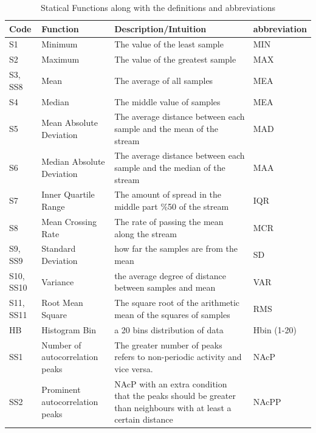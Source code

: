\documentclass[journal,article,submit,moreauthors,pdftex]{Definitions/mdpi}
\begin{document}
\begin{table}[H]
	\caption{Statical Functions along with the definitions and abbreviations }
	\centering
	\begin{tabular}{p{0.9cm}p{5cm}p{7cm}p{1.3cm}}
		\toprule
		\textbf{Code} & \textbf{Function} & \textbf{Description/Intuition} & \textbf{{\scriptsize abbreviation}} \\
		\midrule
		{\footnotesize S1}&Minimum & {\scriptsize The value of the least sample}& MIN\\
		S2&Maximum & {\scriptsize The value of the greatest sample}& MAX\\
		{\footnotesize S3, SS8}&Mean&  {\scriptsize The average of all samples}& MEA\\
		{\footnotesize S4}&Median&  {\scriptsize The middle value of samples}& MEA\\
		{\footnotesize S5}&{\footnotesize Mean Absolute Deviation}& {\scriptsize The average distance between each sample and the mean of the stream}& MAD\\
		{\footnotesize S6}&{\footnotesize Median Absolute Deviation}& {\scriptsize The average distance between each sample and the median of the stream}& MAA\\
		{\footnotesize S7}&Inner Quartile Range  & {\scriptsize The amount of spread in the middle part \%50 of the stream}& IQR\\
		{\footnotesize S8}&Mean Crossing Rate& {\scriptsize The rate of passing the mean along the stream}& MCR\\
		{\footnotesize S9, SS9}&Standard Deviation& {\scriptsize how far the samples are from the mean}& SD\\
		{\footnotesize S10, SS10}&Variance& {\scriptsize the average degree of distance between samples and mean}& VAR\\
		{\footnotesize S11, SS11}&Root Mean Square& {\scriptsize The square root of the arithmetic mean of the squares of samples}& RMS\\
		{\footnotesize HB}& Histogram Bin&{\scriptsize a 20 bins distribution of data } & Hbin (1-20) \\
		{\footnotesize SS1}&Number of autocorrelation peaks& {\scriptsize The greater number of peaks refers to non-periodic activity and vice versa. }& NAcP\\
		{\footnotesize SS2}&Prominent autocorrelation peaks&{\scriptsize NAcP with an extra condition that the peaks should be greater than neighbours with at least a certain distance} & NAcPP \\

\end{tabular}
\end{table}
\end{document}

